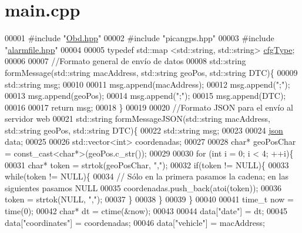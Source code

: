 \hypertarget{main_8cpp_source}{}\section{main.\+cpp}
\label{main_8cpp_source}

\begin{DoxyCode}
00001 \textcolor{preprocessor}{#include "\hyperlink{Obd_8hpp}{Obd.hpp}"}
00002 \textcolor{preprocessor}{#include "picangps.hpp"}
00003 \textcolor{preprocessor}{#include "\hyperlink{alarmfile_8hpp}{alarmfile.hpp}"}
00004 
00005 \textcolor{keyword}{typedef}  std::map <std::string, std::string> \hyperlink{loadcfg_8hpp_a3bc0e674227412446fc364a733cebde6}{cfgType};
00006 
00007 \textcolor{comment}{//Formato general de envío de datos}
00008 std::string formMessage(std::string macAddress, std::string geoPos, std::string DTC)\{
00009     std::string msg;
00010 
00011     msg.append(macAddress);
00012     msg.append(\textcolor{stringliteral}{";"});
00013     msg.append(geoPos);
00014     msg.append(\textcolor{stringliteral}{";"});
00015     msg.append(DTC);
00016 
00017     \textcolor{keywordflow}{return} msg;
00018 \}
00019 
00020 \textcolor{comment}{//Formato JSON para el envío al servidor web}
00021 std::string formMessageJSON(std::string macAddress, std::string geoPos, std::string DTC)\{
00022     std::string msg;
00023 
00024     \hyperlink{Commands_8hpp_ab701e3ac61a85b337ec5c1abaad6742d}{json} data;
00025 
00026     std::vector<int> coordenadas;
00027     
00028     \textcolor{keywordtype}{char}* geoPosChar = \textcolor{keyword}{const\_cast<}\textcolor{keywordtype}{char}*\textcolor{keyword}{>}(geoPos.c\_str());
00029 
00030     \textcolor{keywordflow}{for} (\textcolor{keywordtype}{int} i = 0; i < 4; ++i)\{
00031             \textcolor{keywordtype}{char}* token = strtok(geoPosChar, \textcolor{stringliteral}{","});
00032             \textcolor{keywordflow}{if}(token != NULL)\{
00033                 \textcolor{keywordflow}{while}(token != NULL)\{
00034                 \textcolor{comment}{// Sólo en la primera pasamos la cadena; en las siguientes pasamos NULL}
00035                 coordenadas.push\_back(atoi(token));
00036                 token = strtok(NULL, \textcolor{stringliteral}{","});
00037                 \}
00038             \}
00039     \}
00040 
00041     time\_t now = time(0);
00042     \textcolor{keywordtype}{char}* dt = ctime(&now);
00043 
00044     data[\textcolor{stringliteral}{"date"}] = dt;
00045     data[\textcolor{stringliteral}{"coordinates"}] = coordenadas;
00046     data[\textcolor{stringliteral}{"vehicle"}] = macAddress;

\end{DoxyCode}
